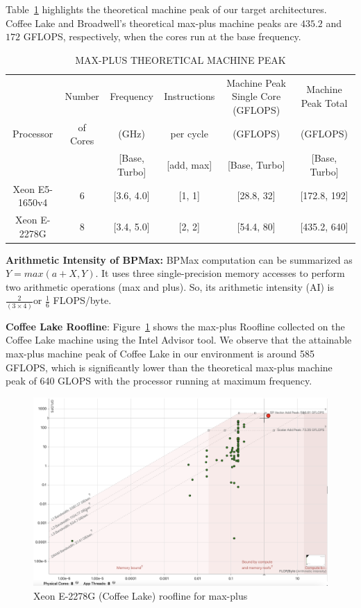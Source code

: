 Table~\ref{tab1:Theoretical_machine_peak} highlights the theoretical machine peak of our target architectures. Coffee Lake and Broadwell's theoretical max-plus machine peaks are $435.2$ and $172$ GFLOPS, respectively, when the cores run at the base frequency.

\begin{table}[htbp]
\caption{\uppercase{Max-plus Theoretical Machine Peak}}
\label{tab1:Theoretical_machine_peak}
\begin{center}
\begin{tabular}{|c|c|c|c|c|c|}
\hline
 & Number &  Frequency &  Instructions & Machine Peak Single Core (GFLOPS)& Machine Peak Total\\
 Processor & of Cores& (GHz)  & per cycle & (GFLOPS) & (GFLOPS)\\
  & &  [Base, Turbo] & [add, max]  & [Base, Turbo] & [Base, Turbo]\\
\hline
Xeon E5-1650v4 & 6 & [3.6, 4.0] & [1, 1] & [28.8, 32] & [172.8, 192] \\
\hline
Xeon E-2278G & 8 & [3.4, 5.0] & [2, 2] & [54.4, 80] & [435.2, 640] \\
\hline
\end{tabular}
\end{center}
\end{table}


\textbf{Arithmetic Intensity of BPMax:} BPMax computation can be summarized as $ Y = max(a + X, Y)$.  It uses three single-precision memory accesses to perform two arithmetic operations (max and plus). So, its arithmetic intensity (AI) is $\frac{2}{(3\times4)}$or $\frac{1}{6}$ FLOPS/byte.

\textbf{Coffee Lake Roofline}: Figure~\ref{fig:roof_line_coffee_lake} shows the max-plus Roofline collected on the Coffee Lake machine using the Intel Advisor tool. We observe that the attainable max-plus machine peak of Coffee Lake in our environment is around 585 GFLOPS, which is significantly lower than the theoretical max-plus machine peak of 640 GLOPS with the processor running at maximum frequency.

\begin{figure}[htbp]
\centerline{\includegraphics[scale=0.20, trim=0 0 0 0,clip]{content/figures/roofline_coffee_lake.png}}
\caption{Xeon E-2278G (Coffee Lake) roofline for max-plus}
\label{fig:roof_line_coffee_lake}
\end{figure}



